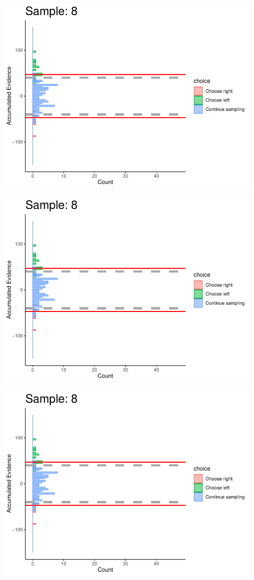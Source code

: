 \documentclass[
]{book}
\begin{document}
\begin{center}\includegraphics[width=0.8\linewidth]{LateNightBayes_files/figure-latex/collapsing_dcb-71} \end{center}

\begin{center}\includegraphics[width=0.8\linewidth]{LateNightBayes_files/figure-latex/collapsing_dcb-72} \end{center}

\begin{center}\includegraphics[width=0.8\linewidth]{LateNightBayes_files/figure-latex/collapsing_dcb-73} \end{center}
\end{document}
